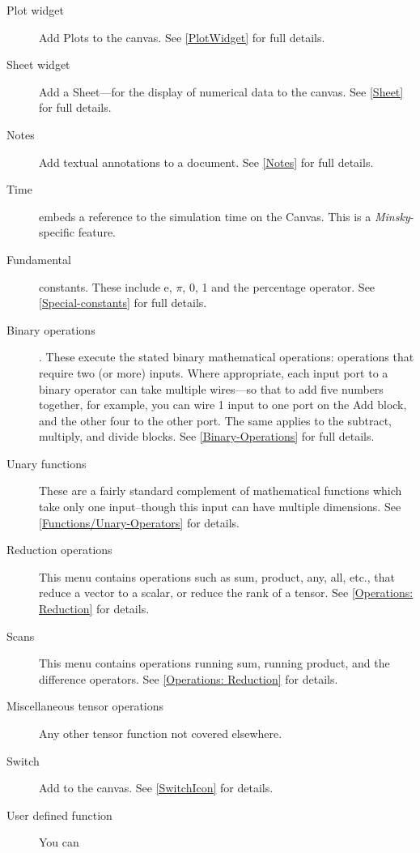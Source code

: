 \begin{description}
\item [{Plot widget}]  Add Plots to the canvas.
See \ref{PlotWidget} for full details.
\item [{Sheet widget}]  Add a Sheet---for the
display of numerical data to the canvas. See \ref{Sheet} for full
details.
\item [{Notes}] Add textual annotations to a document. See \ref{Notes}
for full details.
\item [{Time}]  embeds a reference to the simulation
time on the Canvas. This is a \emph{Minsky}-specific feature.
\item [{Fundamental}] constants. These include e, $\pi$, 0, 1 and the
percentage operator. See \ref{Special-constants} for full details.
\item [{Binary operations}] . These execute
the stated binary mathematical operations: operations that require
two (or more) inputs. Where appropriate, each input port to a binary
operator can take multiple wires---so that to add five numbers together,
for example, you can wire 1 input to one port on the Add block, and
the other four to the other port. The same applies to the subtract,
multiply, and divide blocks. See \ref{Binary-Operations} for full
details.
\item [{Unary functions}]  These are a fairly standard
complement of mathematical functions which take only one input--though
this input can have multiple dimensions. See \ref{Functions/Unary-Operators}
for details.
\item [{Reduction operations}]  This menu contains
operations such as sum, product, any, all, etc., that reduce a vector
to a scalar, or reduce the rank of a tensor. See \ref{Operations: Reduction}
for details.
\item [{Scans}]  This menu contains operations
running sum, running product, and the difference operators. See \ref{Operations: Reduction}
for details.
\item [{Miscellaneous tensor operations}] 
Any other tensor function not covered elsewhere.
\item [{Switch}]  Add  to the canvas. See \ref{SwitchIcon}
for details.
\item [{User defined function}]  You can

\end{description}
